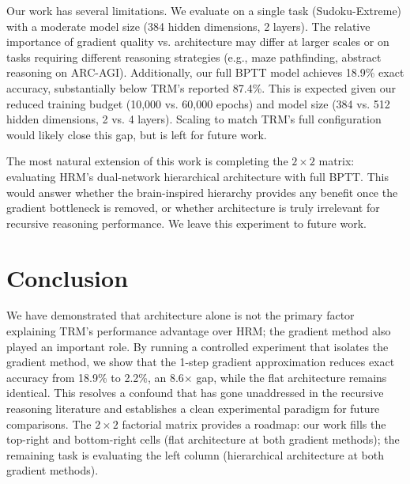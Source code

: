 \documentclass{article}
\begin{document}
Our work has several limitations. We evaluate on a single task (Sudoku-Extreme) with a moderate model size (384 hidden dimensions, 2 layers). The relative importance of gradient quality vs. architecture may differ at larger scales or on tasks requiring different reasoning strategies (e.g., maze pathfinding, abstract reasoning on ARC-AGI). Additionally, our full BPTT model achieves 18.9\% exact accuracy, substantially below TRM's reported 87.4\%. This is expected given our reduced training budget (10,000 vs. 60,000 epochs) and model size (384 vs. 512 hidden dimensions, 2 vs. 4 layers). Scaling to match TRM's full configuration would likely close this gap, but is left for future work.

The most natural extension of this work is completing the $2\times2$ matrix: evaluating HRM's dual-network hierarchical architecture with full BPTT. This would answer whether the brain-inspired hierarchy provides any benefit once the gradient bottleneck is removed, or whether architecture is truly irrelevant for recursive reasoning performance. We leave this experiment to future work.

\section{Conclusion}

We have demonstrated that architecture alone is not the primary factor explaining TRM's performance advantage over HRM; the gradient method also played an important role. By running a controlled experiment that isolates the gradient method, we show that the 1-step gradient approximation reduces exact accuracy from 18.9\% to 2.2\%, an 8.6$\times$ gap, while the flat architecture remains identical. This resolves a confound that has gone unaddressed in the recursive reasoning literature and establishes a clean experimental paradigm for future comparisons. The $2\times2$ factorial matrix provides a roadmap: our work fills the top-right and bottom-right cells (flat architecture at both gradient methods); the remaining task is evaluating the left column (hierarchical architecture at both gradient methods).



\end{document}
